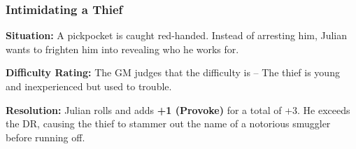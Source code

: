 \subsubsection{Intimidating a Thief}
\begin{DndReadAloud}{}
	\textbf{Situation:} A pickpocket is caught red-handed. Instead of arresting him, Julian wants to frighten him into revealing who he works for.

	\noindent\textbf{Difficulty Rating:} The GM judges that the difficulty is \Basic – The thief is young and inexperienced but used to trouble.

	\noindent\textbf{Resolution:} Julian rolls  and adds \textbf{+1 (Provoke)} for a total of +3. He exceeds the DR, causing the thief to stammer out the name of a notorious smuggler before running off.
\end{DndReadAloud}
